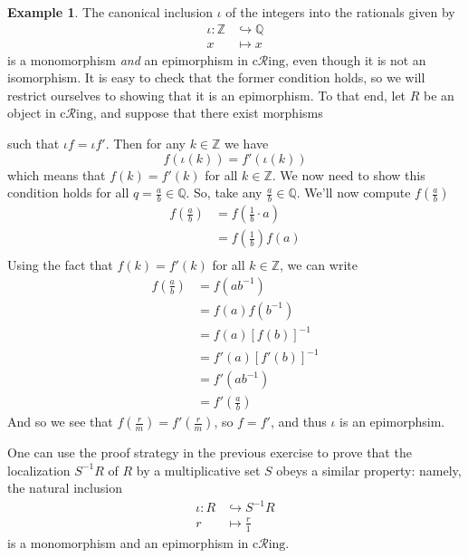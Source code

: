 \documentclass[10pt,oneside]{book}
\def\~#1{\mathscr{#1}}
\newcommand{\Q}{\mathbb{Q}}
\newcommand{\Z}{\mathbb{Z}}
\newcommand{\cRing}{\mathrm{c}\~{R}\mathrm{ing}}
\theoremstyle{plain}
\theoremstyle{definition}
\newtheorem{ex}[thm]{Example}
\theoremstyle{remark}
\numberwithin{equation}{section}
\numberwithin{figure}{section}
\begin{document}
\begin{ex}\label{ex:incl_of_Z_into_Q}
     The canonical inclusion $\iota$ of the integers into the rationals given by
    \begin{align*}
        \iota: \Z &\hookrightarrow \Q \\
        x &\mapsto x
    \end{align*}
    is a monomorphism \emph{and} an epimorphism in \textup{$\cRing$}, even though it is not an isomorphism.  It is easy to check that the former condition holds, so we will restrict ourselves to showing that it is an epimorphism. To that end, let $R$ be an object in $\cRing$, and suppose that there exist morphisms  such that $\iota f = \iota f'$. Then for any $k \in \Z$ we have 
    \[f(\iota(k)) = f'(\iota(k))\]
    which means that $f(k) = f'(k)$ for all $k \in \Z$. We now need to show this condition holds for all $q = \frac{a}{b} \in \Q$. So, take any $\frac{a}{b} \in \Q$. We'll now compute $f(\frac{a}{b})$
    \begin{align*}
        f\left(\frac{a}{b}\right) &= f\left(\frac{1}{b} \cdot a\right) \\
                                  &= f\left(\frac{1}{b}\right)f\left(a\right) \\
    \end{align*}
    Using the fact that $f(k) = f'(k)$ for all $k \in \Z$, we can write
    \begin{align*}
        f\left(\frac{a}{b}\right) &= f\left(ab^{-1}\right) \\
                                  &= f\left(a \right)f\left(b^{-1}\right) \\
                                  &= f\left(a\right)\left[f\left(b \right)\right]^{-1} \\
                                  &= f'\left(a\right)\left[f'\left(b \right)\right]^{-1} \\
                                  &= f'\left(ab^{-1}\right) \\
                                  &= f'\left(\frac{a}{b}\right)
    \end{align*}
    And so we see that $f(\frac{r}{m}) = f'(\frac{r}{m})$, so $f = f'$, and thus $\iota$ is an epimorphsim.
\end{ex}

One can use the proof strategy in the previous exercise to prove that the localization $S^{-1}R$ of $R$ by a multiplicative set $S$ obeys a similar property: namely, the natural inclusion
    \begin{align*}
        \iota: R &\hookrightarrow S^{-1}R\\
        r &\mapsto \frac{r}{1}
    \end{align*}
    is a monomorphism and an epimorphism in \textup{$\cRing$}.
\end{document}
